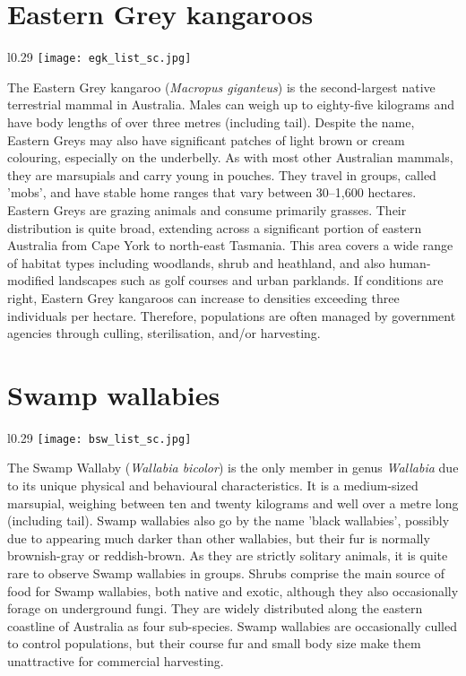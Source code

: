 \section{Eastern Grey kangaroos}\label{egk}
\vspace{-0.3cm}
\setlength\intextsep{0pt}
\begin{wrapfigure}[5]{l}{0.29\textwidth}
\centering
\texttt{[image: egk\_list\_sc.jpg]}
\end{wrapfigure}
The Eastern Grey kangaroo (\textit{Macropus giganteus}) is the second-largest native terrestrial mammal in Australia. Males can weigh up to eighty-five kilograms and have body lengths of over three metres (including tail). Despite the name, Eastern Greys may also have significant patches of light brown or cream colouring, especially on the underbelly. As with most other Australian mammals, they are marsupials and carry young in pouches. They travel in groups, called 'mobs', and have stable home ranges that vary between 30--1,600 hectares. Eastern Greys are grazing animals and consume primarily grasses. Their distribution is quite broad, extending across a significant portion of eastern Australia from Cape York to north-east Tasmania. This area covers a wide range of habitat types including woodlands, shrub and heathland, and also human-modified landscapes such as golf courses and urban parklands. If conditions are right, Eastern Grey kangaroos can increase to densities exceeding three individuals per hectare. Therefore, populations are often managed by government agencies through culling, sterilisation, and/or harvesting.

\section{Swamp wallabies}\label{bsw}
\vspace{-0.3cm}
\setlength\intextsep{0pt}
\begin{wrapfigure}{l}{0.29\textwidth}
\centering
\texttt{[image: bsw\_list\_sc.jpg]}
\end{wrapfigure}
The Swamp Wallaby (\textit{Wallabia bicolor}) is the only member in genus \textit{Wallabia} due to its unique physical and behavioural characteristics. It is a medium-sized marsupial, weighing between ten and twenty kilograms and well over a metre long (including tail). Swamp wallabies also go by the name 'black wallabies', possibly due to appearing much darker than other wallabies, but their fur is normally brownish-gray or reddish-brown. As they are strictly solitary animals, it is quite rare to observe Swamp wallabies in groups. Shrubs comprise the main source of food for Swamp wallabies, both native and exotic, although they also occasionally forage on underground fungi. They are widely distributed along the eastern coastline of Australia as four sub-species. Swamp wallabies are occasionally culled to control populations, but their course fur and small body size make them unattractive for commercial harvesting.

